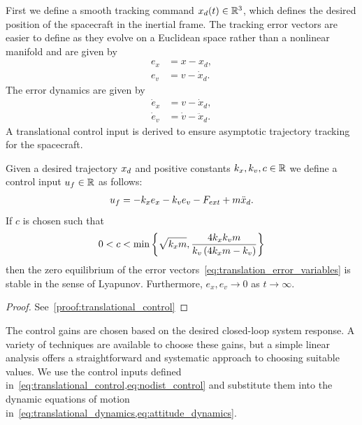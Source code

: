 First we define a smooth tracking command \( x_d(t) \in \mathbb{R}^3 \), which defines the desired position of the spacecraft in the inertial frame.
The tracking error vectors are easier to define as they evolve on a Euclidean space rather than a nonlinear manifold and are given by
\begin{subequations}\label{eq:translation_error_variables}
\begin{align}
    e_x &= x - x_d ,\\
    e_v &= v - \dot{x}_d.
\end{align}
\end{subequations}
The error dynamics are given by
\begin{subequations}\label{eq:translation_error_dynamics}
\begin{align}
    \dot{e}_x &= v - \dot{x}_d, \\
    \dot{e}_v &= \dot{v} - \ddot{x}_d .
\end{align}
\end{subequations}
A translational control input is derived to ensure asymptotic trajectory tracking for the spacecraft.
\begin{prop}\label{prop:translational_control}
    Given a desired trajectory \( x_d \) and positive constants \( k_x, k_v, c \in \mathbb{R} \) we define a control input \( u_f \in \mathbb{R} \) as follows:
    \begin{align}\label{eq:translational_control}
        u_f = -k_x e_x - k_v e_v - F_{ext} + m \ddot{x}_d .
    \end{align}
    If \( c \) is chosen such that
    \begin{align}\label{eq:translational_control_gain_bound}
        0 < c < \min \left\{ \sqrt{k_x m}, \frac{4 k_x k_v m}{ k_v \left( 4 k_x m - k_v \right) }    \right\}
    \end{align}
    then the zero equilibrium of the error vectors~\cref{eq:translation_error_variables} is stable in the sense of Lyapunov.
    Furthermore, \( e_x, e_v \to 0 \) as \( t \to \infty\).
\end{prop}
\begin{proof}
    See~\cref{proof:translational_control}
\end{proof}

The control gains are chosen based on the desired closed-loop system response. 
A variety of techniques are available to choose these gains, but a simple linear analysis offers a straightforward and systematic approach to choosing suitable values. 
We use the control inputs defined in~\cref{eq:translational_control,eq:nodist_control} and substitute them into the dynamic equations of motion in~\cref{eq:translational_dynamics,eq:attitude_dynamics}.

